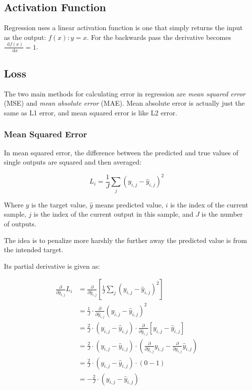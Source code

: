 \documentclass[a4paper]{article}
\newcommand*\diff{\mathop{}\!\mathrm{d}}
\begin{document}
\subsection*{Activation Function}
Regression uses a linear activation function is one that simply returns the input as the output: $f(x): y=x$. For the backwards pass the derivative becomes $\frac{\diff f(x)}{\diff x} = 1$.

\subsection*{Loss}
The two main methods for calculating error in regression are \emph{mean squared error} (MSE) and \emph{mean absolute error} (MAE). Mean absolute error is actually just the same as L1 error, and mean squared error is like L2 error.

\subsubsection*{Mean Squared Error}
In mean squared error, the difference between the predicted and true values of single outputs are squared and then averaged:

\begin{equation*}
    L_i = \frac{1}{J} \sum_j (y_{i,j} - \hat{y}_{i,j})^2
\end{equation*}

Where $y$ is the target value, $\hat{y}$ means predicted value, $i$ is the index of the current sample, $j$ is the index of the current output in this sample, and $J$ is the number of outputs.

The idea is to penalize more harshly the further away the predicted value is from the intended target. 

Its partial derivative is given as:

\begin{align*}
    \frac{\partial}{\partial\hat{y}_{i,j}} L_i &= \frac{\partial}{\partial\hat{y}_{i,j}} \left[ \frac{1}{J}\sum_j(y_{i,j} - \hat{y}_{i,j})^2 \right] \\
    &= \frac{1}{J} \cdot \frac{\partial}{\partial\hat{y}_{i,j}}(y_{i,j} - \hat{y}_{i,j})^2 \\
    &= \frac{2}{J} \cdot (y_{i,j} - \hat{y}_{i,j}) \cdot \frac{\partial}{\partial\hat{y}_{i,j}}[y_{i,j}-\hat{y}_{i,j}] \\
    &= \frac{2}{J} \cdot (y_{i,j} - \hat{y}_{i,j}) \cdot (\frac{\partial}{\partial\hat{y}_{i,j}}y_{i,j} - \frac{\partial}{\partial\hat{y}_{i,j}}\hat{y}_{i,j}) \\
    &= \frac{2}{J} \cdot (y_{i,j} - \hat{y}_{i,j}) \cdot (0-1) \\
    &= -\frac{2}{J} \cdot (y_{i,j} - \hat{y}_{i,j})
\end{align*}
\end{document}
